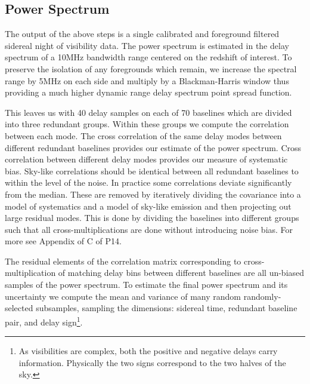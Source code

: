 \documentclass[preprint]{aastex}
\begin{document}
\subsection{Power Spectrum}
\label{sec:power_spectrum}
The output of the above steps is a single calibrated and foreground filtered sidereal night of visibility data. The power spectrum is estimated in the delay spectrum of  a 10MHz bandwidth range centered on the redshift of interest. To preserve the isolation of any foregrounds which remain, we increase the spectral range by 5MHz on each side and multiply by a Blackman-Harris window thus providing a much higher dynamic range delay spectrum point spread function. 

This leaves us with 40 delay samples on each of 70 baselines which are divided into three redundant groups. Within these groups we compute the  correlation between each mode.  The cross correlation of the same delay modes between different redundant baselines provides our estimate of the power spectrum.  Cross correlation between different delay modes provides our measure of systematic bias.  Sky-like correlations should be identical between all redundant baselines to within the level of the noise. In practice some correlations deviate significantly from the median.  These are removed by iteratively dividing the covariance into a model of systematics and a model of sky-like emission and then projecting out large residual modes. This is done by dividing the baselines into different groups such that all cross-multiplications are done without introducing noise bias.  For more see Appendix of C of P14.

The residual elements of the correlation matrix corresponding to cross-multiplication of matching delay bins between different baselines are all un-biased samples of the power spectrum. To estimate the final power spectrum and its uncertainty we compute the mean and variance of many random randomly-selected subsamples, sampling the dimensions: sidereal time, redundant baseline pair, and delay sign\footnote{As visibilities are complex, both the positive and negative delays  carry  information. Physically the two signs correspond to the two halves of the sky.}.
\end{document}
